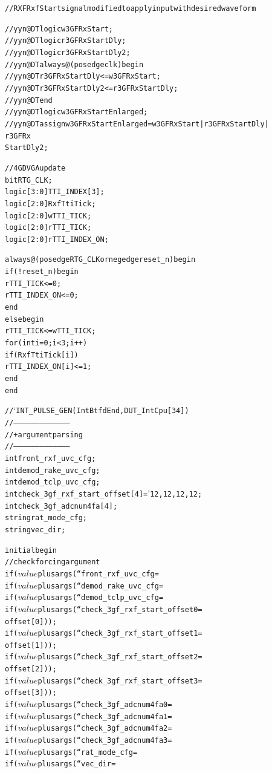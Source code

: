 \documentclass{note}
\begin{document}
\begin{alltt}
   // RXF RxfStart signal modified to apply input with desired waveform

   // yyn@DT  logic w3GFRxStart;
   // yyn@DT  logic r3GFRxStartDly;
   // yyn@DT  logic r3GFRxStartDly2;
   // yyn@DT  always @(posedge clk) begin
   // yyn@DT    r3GFRxStartDly <= w3GFRxStart;
   // yyn@DT    r3GFRxStartDly2 <= r3GFRxStartDly;
   // yyn@DT  end
   // yyn@DT  logic w3GFRxStartEnlarged;
   // yyn@DT  assign w3GFRxStartEnlarged = w3GFRxStart | r3GFRxStartDly |
   r3GFRx
StartDly2;



   // 4G DVGA update
   bit                  RTG_CLK;
   logic   [3:0]        TTI_INDEX[3];
   logic   [2:0]        RxfTtiTick;
   logic   [2:0]        wTTI_TICK;
   logic   [2:0]        rTTI_TICK;
   logic   [2:0]        rTTI_INDEX_ON;

   always @(posedge RTG_CLK or negedge reset_n) begin
      if (!reset_n) begin
         rTTI_TICK <= 0;
         rTTI_INDEX_ON <= 0;
      end
      else begin
         rTTI_TICK <= wTTI_TICK;
         for (int i = 0; i < 3; i++)
            if (RxfTtiTick[i])
               rTTI_INDEX_ON[i] <= 1;
      end
   end


   // `INT_PULSE_GEN (IntBtfdEnd,DUT_IntCpu[34])
   // ---------------------------------------
   // + argument parsing
   // ---------------------------------------
   int front_rxf_uvc_cfg;
   int demod_rake_uvc_cfg;
   int demod_tclp_uvc_cfg;
   int check_3gf_rxf_start_offset[4] = '{12,12,12,12};
   int check_3gf_adcnum4fa[4];
   string rat_mode_cfg;
   string vec_dir;

   initial begin
      // check forcing argument
      if ($value$plusargs(``front_rxf_uvc_cfg=%
      if ($value$plusargs(``demod_rake_uvc_cfg=%
      if ($value$plusargs(``demod_tclp_uvc_cfg=%
      if ($value$plusargs(``check_3gf_rxf_start_offset0=%
offset[0]));
      if ($value$plusargs(``check_3gf_rxf_start_offset1=%
offset[1]));
      if ($value$plusargs(``check_3gf_rxf_start_offset2=%
offset[2]));
      if ($value$plusargs(``check_3gf_rxf_start_offset3=%
offset[3]));
      if ($value$plusargs(``check_3gf_adcnum4fa0=%
      if ($value$plusargs(``check_3gf_adcnum4fa1=%
      if ($value$plusargs(``check_3gf_adcnum4fa2=%
      if ($value$plusargs(``check_3gf_adcnum4fa3=%
      if ($value$plusargs(``rat_mode_cfg=%
      if ($value$plusargs(``vec_dir=%


\end{alltt}
\end{document}
